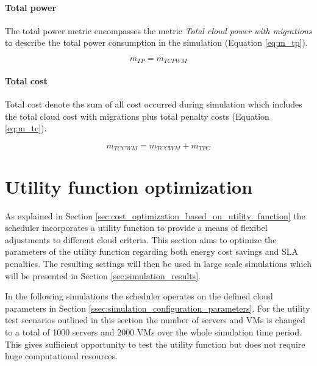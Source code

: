 \paragraph{Total power}

The total power metric encompasses the metric \textit{Total cloud power with migrations} to describe the total power consumption in the simulation (Equation \ref{eq:m_tp}). 

\begin{equation}
	m_{TP} = m_{TCPWM}
\label{eq:m_tp}
\end{equation}

\paragraph{Total cost}

Total cost denote the sum of all cost occurred during simulation which includes the total cloud cost with migrations plus total penalty costs (Equation \ref{eq:m_tc}). 

\begin{equation}
	m_{TCCWM} = m_{TCCWM} + m_{TPC}
\label{eq:m_tc}
\end{equation}









\section{Utility function optimization} \label{sec:utility_function_optimization}

As explained in Section \ref{sec:cost_optimization_based_on_utility_function} the scheduler incorporates a utility function to provide a means of flexibel adjustments to different cloud criteria. This section aims to optimize the parameters of the utility function regarding both energy cost savings and SLA penalties. The resulting settings will then be used in large scale simulations which will be presented in Section \ref{sec:simulation_results}. 

In the following simulations the scheduler operates on the defined cloud parameters in Section \ref{ssec:simulation_configuration_parameters}. 
For the utility test scenarios outlined in this section the number of servers and VMs is changed to a total of 1000 servers and 2000 VMs over the whole simulation time period. This gives sufficient opportunity to test the utility function but does not require huge computational resources. 

